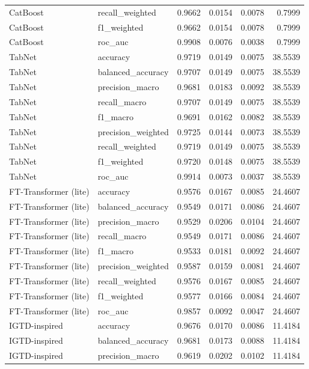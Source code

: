 \begin{tabular}{llrrrr}
CatBoost & recall_weighted & 0.9662 & 0.0154 & 0.0078 & 0.7999 \\
CatBoost & f1_weighted & 0.9662 & 0.0154 & 0.0078 & 0.7999 \\
CatBoost & roc_auc & 0.9908 & 0.0076 & 0.0038 & 0.7999 \\
TabNet & accuracy & 0.9719 & 0.0149 & 0.0075 & 38.5539 \\
TabNet & balanced_accuracy & 0.9707 & 0.0149 & 0.0075 & 38.5539 \\
TabNet & precision_macro & 0.9681 & 0.0183 & 0.0092 & 38.5539 \\
TabNet & recall_macro & 0.9707 & 0.0149 & 0.0075 & 38.5539 \\
TabNet & f1_macro & 0.9691 & 0.0162 & 0.0082 & 38.5539 \\
TabNet & precision_weighted & 0.9725 & 0.0144 & 0.0073 & 38.5539 \\
TabNet & recall_weighted & 0.9719 & 0.0149 & 0.0075 & 38.5539 \\
TabNet & f1_weighted & 0.9720 & 0.0148 & 0.0075 & 38.5539 \\
TabNet & roc_auc & 0.9914 & 0.0073 & 0.0037 & 38.5539 \\
FT-Transformer (lite) & accuracy & 0.9576 & 0.0167 & 0.0085 & 24.4607 \\
FT-Transformer (lite) & balanced_accuracy & 0.9549 & 0.0171 & 0.0086 & 24.4607 \\
FT-Transformer (lite) & precision_macro & 0.9529 & 0.0206 & 0.0104 & 24.4607 \\
FT-Transformer (lite) & recall_macro & 0.9549 & 0.0171 & 0.0086 & 24.4607 \\
FT-Transformer (lite) & f1_macro & 0.9533 & 0.0181 & 0.0092 & 24.4607 \\
FT-Transformer (lite) & precision_weighted & 0.9587 & 0.0159 & 0.0081 & 24.4607 \\
FT-Transformer (lite) & recall_weighted & 0.9576 & 0.0167 & 0.0085 & 24.4607 \\
FT-Transformer (lite) & f1_weighted & 0.9577 & 0.0166 & 0.0084 & 24.4607 \\
FT-Transformer (lite) & roc_auc & 0.9857 & 0.0092 & 0.0047 & 24.4607 \\
IGTD-inspired & accuracy & 0.9676 & 0.0170 & 0.0086 & 11.4184 \\
IGTD-inspired & balanced_accuracy & 0.9681 & 0.0173 & 0.0088 & 11.4184 \\
IGTD-inspired & precision_macro & 0.9619 & 0.0202 & 0.0102 & 11.4184 \\

\end{tabular}
